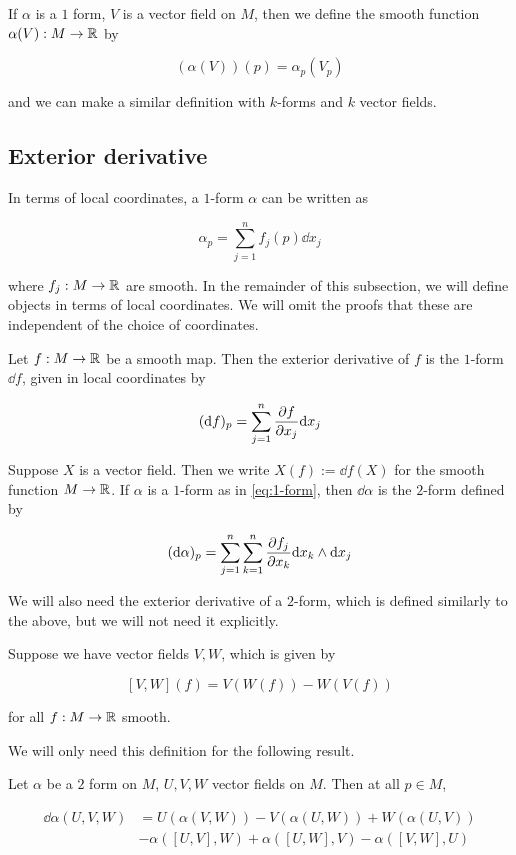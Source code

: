 \documentclass{article}
\begin{document}
If \(\alpha\) is a \(1\) form, \(V\) is a vector field on \(M\), then we define the smooth function \(\alpha(V) : M \to \mathbb{R}\) by

\[(\alpha(V))(p) = \alpha_p(V_p)\]

and we can make a similar definition with \(k\)-forms and \(k\) vector fields.

\subsection{Exterior derivative}

In terms of local coordinates, a \(1\)-form \(\alpha\) can be written as

\begin{equation}
    \label{eq:1-form}
    \alpha_p = \sum_{j=1}^n f_j(p)\dd x_j
\end{equation}

where \(f_j : M \to \mathbb{R}\) are smooth. In the remainder of this subsection, we will define objects in terms of local coordinates. We will omit the proofs that these are independent of the choice of coordinates.

Let \(f : M \to \mathbb{R}\) be a smooth map. Then the exterior derivative of \(f\) is the \(1\)-form \(\dd f\), given in local coordinates by

\[(\dd f)_p = \sum_{j=1}^n \pdv{f}{x_j}(p)\dd x_j\]

Suppose \(X\) is a vector field. Then we write \(X(f) := \dd f(X)\) for the smooth function \(M \to \mathbb{R}\). If \(\alpha\) is a \(1\)-form as in \cref{eq:1-form}, then \(\dd\alpha\) is the \(2\)-form defined by

\[(\dd\alpha)_p = \sum_{j=1}^n\sum_{k=1}^n \pdv{f_j}{x_k}(p)\dd x_k \wedge \dd x_j\]

We will also need the exterior derivative of a \(2\)-form, which is defined similarly to the above, but we will not need it explicitly.

\begin{definition}

    Suppose we have vector fields \(V, W\), which is given by

    \[[V, W](f) = V(W(f)) - W(V(f))\]

    for all \(f : M \to \mathbb{R}\) smooth.
\end{definition}

We will only need this definition for the following result.

\begin{lemma}
    \label{lem:deriv-2-form}
    Let \(\alpha\) be a \(2\) form on \(M\), \(U, V, W\) vector fields on \(M\). Then at all \(p \in M\),

    \begin{align*}
        \dd\alpha(U, V, W) &= U(\alpha(V, W)) - V(\alpha(U, W)) + W(\alpha(U, V)) \\
        &- \alpha([U, V], W) + \alpha([U, W], V) - \alpha([V, W], U)
    \end{align*}
\end{lemma}
\end{document}
